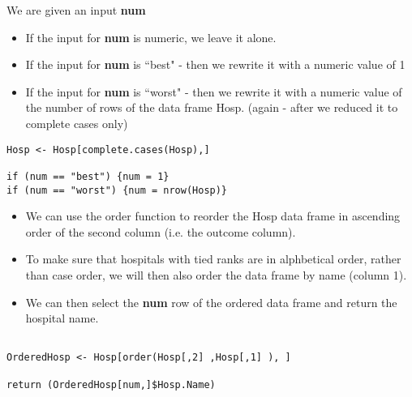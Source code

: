 \documentclass[]{article}
\begin{document}
We are given an input \textbf{num}

\begin{itemize}
\item If the input for \textbf{num} is numeric, we leave it alone.
\item If the input for \textbf{num} is ``best" - then we rewrite it with a numeric value of 1
\item If the input for \textbf{num} is ``worst" - then we rewrite it with a numeric value of the number of rows of the data frame Hosp. (again - after we reduced it to complete cases only)
\end{itemize}

\begin{framed}
\begin{verbatim}
Hosp <- Hosp[complete.cases(Hosp),]

if (num == "best") {num = 1}
if (num == "worst") {num = nrow(Hosp)}
\end{verbatim}
\end{framed}

\begin{itemize}
\item We can use the order function to reorder the Hosp data frame in ascending order of the second column (i.e. the outcome column). 
\item To make sure that hospitals with tied ranks are in alphbetical order, rather than case order, we will then also order the data frame by name (column 1).

\item We can then select the \textbf{num} row of the ordered data frame and return the hospital name.
\end{itemize}
\begin{framed}
\begin{verbatim}

OrderedHosp <- Hosp[order(Hosp[,2] ,Hosp[,1] ), ]

return (OrderedHosp[num,]$Hosp.Name)
\end{verbatim}
\end{framed}
\end{document}
